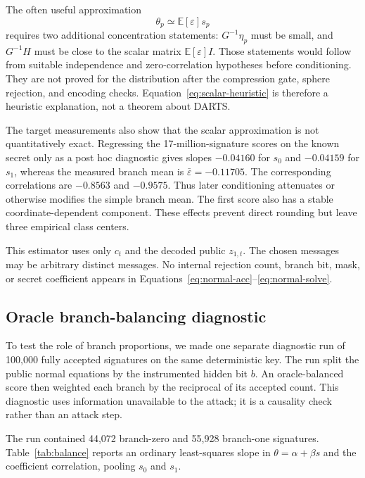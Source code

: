 \documentclass[11pt,a4paper]{article}
\newcommand{\E}{\mathbb{E}}
\begin{document}
The often useful approximation
\begin{equation}
                       \theta_p\simeq\E[\varepsilon]s_p
\label{eq:scalar-heuristic}
\end{equation}
requires two additional concentration statements: $G^{-1}\eta_p$ must be
small, and $G^{-1}H$ must be close to the scalar matrix
$\E[\varepsilon]I$.  Those statements would follow from suitable
independence and zero-correlation hypotheses before conditioning.  They are
not proved for the distribution after the compression gate, sphere
rejection, and encoding checks.  Equation~\eqref{eq:scalar-heuristic} is
therefore a heuristic explanation, not a theorem about DARTS.

The target measurements also show that the scalar approximation is not
quantitatively exact.  Regressing the 17-million-signature scores on the
known secret only as a post hoc diagnostic gives slopes $-0.04160$ for
$s_0$ and $-0.04159$ for $s_1$, whereas the measured branch mean is
$\bar\varepsilon=-0.11705$.  The corresponding correlations are $-0.8563$
and $-0.9575$.  Thus later conditioning attenuates or otherwise modifies the
simple branch mean.  The first score also has a stable coordinate-dependent
component.  These effects prevent direct rounding but leave three empirical
class centers.

This estimator uses only $c_t$ and the decoded public $z_{1,t}$.  The chosen
messages may be arbitrary distinct messages.  No internal rejection count,
branch bit, mask, or secret coefficient appears in
Equations~\eqref{eq:normal-acc}--\eqref{eq:normal-solve}.

\subsection{Oracle branch-balancing diagnostic}

To test the role of branch proportions, we made one separate diagnostic run
of 100,000 fully accepted signatures on the same deterministic key.  The run
split the public normal equations by the instrumented hidden bit $b$.  An
oracle-balanced score then weighted each branch by the reciprocal of its
accepted count.  This diagnostic uses information unavailable to the attack;
it is a causality check rather than an attack step.

The run contained 44,072 branch-zero and 55,928 branch-one signatures.
Table~\ref{tab:balance} reports an ordinary least-squares slope in
$\theta=\alpha+\beta s$ and the coefficient correlation, pooling $s_0$ and
$s_1$.
\end{document}

